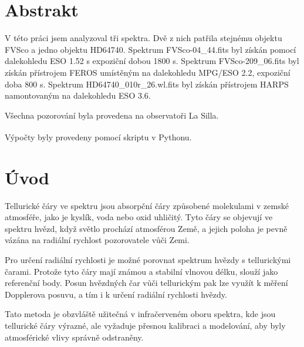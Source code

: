 \documentclass[a4paper,11pt,twocolumn]{article}
\begin{document}

    \vskip10pt
    \section{Abstrakt}
        V této práci jsem analyzoval tři spektra. Dvě z nich patřila stejnému objektu FVSco a jedno objektu HD64740. Spektrum FVSco-04\_44.fits byl získán pomocí dalekohledu ESO 1.52 s expoziční dobou 1800 s. Spektrum FVSco-209\_06.fits byl získán přístrojem FEROS umístěným na dalekohledu MPG/ESO 2.2, expoziční doba 800 s. Spektrum HD64740\_010r\_26.wl.fits byl získán přístrojem HARPS namontovaným na dalekohledu ESO 3.6. 
        
        Všechna pozorování byla provedena na observatoři La Silla.
        
        Výpočty byly provedeny pomocí skriptu v Pythonu\textsuperscript{\cite{github}}.
    \section{Úvod}
        Tellurické čáry ve spektru jsou absorpční čáry způsobené molekulami v zemské atmosféře, jako je kyslík, voda nebo oxid uhličitý. Tyto čáry se objevují ve spektru hvězd, když světlo prochází atmosférou Země, a jejich poloha je pevně vázána na radiální rychlost pozorovatele vůči Zemi.

        Pro určení radiální rychlosti je možné porovnat spektrum hvězdy s tellurickými čarami. Protože tyto čáry mají známou a stabilní vlnovou délku, slouží jako referenční body. Posun hvězdných čar vůči tellurickým pak lze využít k měření Dopplerova posuvu, a tím i k určení radiální rychlosti hvězdy.
        
        Tato metoda je obzvláště užitečná v infračerveném oboru spektra, kde jsou tellurické čáry výrazné, ale vyžaduje přesnou kalibraci a modelování, aby byly atmosférické vlivy správně odstraněny.
\end{document}
